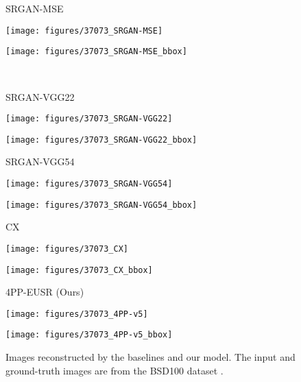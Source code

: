 \documentclass[runningheads]{llncs}
\begin{document}
\begin{figure*}[]
	\begin{minipage}[b]{0.24\linewidth}
		\centering
		\centerline{\scriptsize{SRGAN-MSE}}\medskip
		\centerline{\texttt{[image: figures/37073\_SRGAN-MSE]}}\smallskip
		\centerline{\texttt{[image: figures/37073\_SRGAN-MSE\_bbox]}}
	\end{minipage}
	\medskip \\ \medskip
	\begin{minipage}[b]{0.24\linewidth}
		\centering
		\centerline{\scriptsize{SRGAN-VGG22}}\medskip
		\centerline{\texttt{[image: figures/37073\_SRGAN-VGG22]}}\smallskip
		\centerline{\texttt{[image: figures/37073\_SRGAN-VGG22\_bbox]}}
	\end{minipage}
	\begin{minipage}[b]{0.24\linewidth}
		\centering
		\centerline{\scriptsize{SRGAN-VGG54}}\medskip
		\centerline{\texttt{[image: figures/37073\_SRGAN-VGG54]}}\smallskip
		\centerline{\texttt{[image: figures/37073\_SRGAN-VGG54\_bbox]}}
	\end{minipage}
	\begin{minipage}[b]{0.24\linewidth}
		\centering
		\centerline{\scriptsize{CX}}\medskip
		\centerline{\texttt{[image: figures/37073\_CX]}}\smallskip
		\centerline{\texttt{[image: figures/37073\_CX\_bbox]}}
	\end{minipage}
	\begin{minipage}[b]{0.24\linewidth}
		\centering
		\centerline{\scriptsize{4PP-EUSR (Ours)}}\medskip
		\centerline{\texttt{[image: figures/37073\_4PP-v5]}}\smallskip
		\centerline{\texttt{[image: figures/37073\_4PP-v5\_bbox]}}
	\end{minipage}
	\caption{Images reconstructed by the baselines and our model. The input and ground-truth images are from the BSD100 dataset \cite{martin2001database}.}
	\label{fig:result_baseline_comparison2}
\end{figure*}
\end{document}
